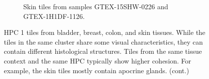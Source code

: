 \documentclass{l4proj}
\begin{document}
\begin{appendices}
\begin{figure}
\begin{subfigure}[b]{\textwidth}
        \caption{Skin tiles from samples GTEX-15SHW-0226 and GTEX-1H1DF-1126.}
        \label{fig:leiden1_skin}
    \end{subfigure}
    \caption{HPC 1 tiles from  bladder,  breast,  colon, and  skin tissues. While the tiles in the same cluster share some visual characteristics, they can contain different histological structures. Tiles from the same tissue context and the same HPC typically show higher cohesion. For example, the skin tiles mostly contain apocrine glands. (cont.)}
\end{figure}
    
\end{appendices}





\renewcommand{\thechapter}{0} 

\end{document}
